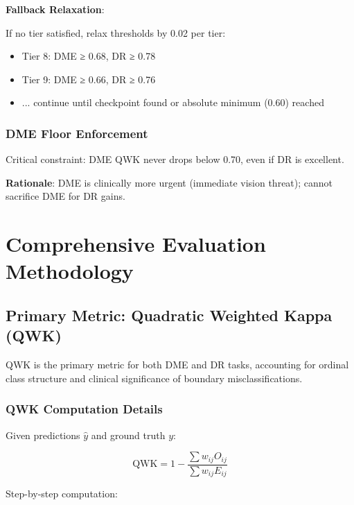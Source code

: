 \textbf{Fallback Relaxation}:

If no tier satisfied, relax thresholds by 0.02 per tier:
\begin{itemize}
    \item Tier 8: DME ≥ 0.68, DR ≥ 0.78
    \item Tier 9: DME ≥ 0.66, DR ≥ 0.76
    \item ... continue until checkpoint found or absolute minimum (0.60) reached
\end{itemize}

\subsubsection{DME Floor Enforcement}

Critical constraint: DME QWK never drops below 0.70, even if DR is excellent.

\textbf{Rationale}: DME is clinically more urgent (immediate vision threat); cannot sacrifice DME for DR gains.

\newpage

\section{Comprehensive Evaluation Methodology}

\subsection{Primary Metric: Quadratic Weighted Kappa (QWK)}

QWK is the primary metric for both DME and DR tasks, accounting for ordinal class structure and clinical significance of boundary misclassifications.

\subsubsection{QWK Computation Details}

Given predictions $\hat{y}$ and ground truth $y$:

\begin{equation}
\text{QWK} = 1 - \frac{\sum w_{ij} O_{ij}}{\sum w_{ij} E_{ij}}
\end{equation}

Step-by-step computation:

